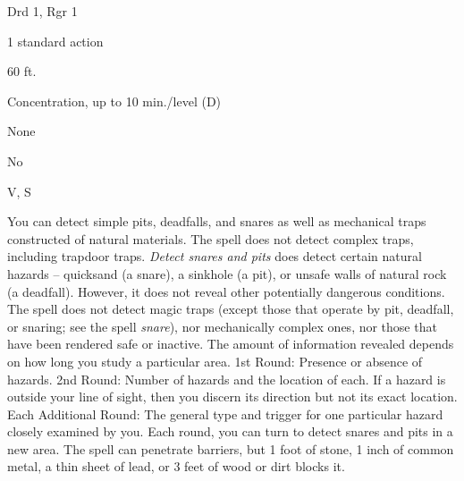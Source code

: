 
\begin{description*}
\item[Level:] Drd 1, Rgr 1
\item[Casting Time:] 1 standard action
\item[Range:] 60 ft.
\item[Duration:] Concentration, up to 10 min./level (D)
\item[Saving Throw:] None
\item[Spell Resistance:] No
\item[Components:] V, S
\end{description*}

You can detect simple pits, deadfalls, and snares as well as mechanical traps constructed
of natural materials. The spell does not detect complex traps, including trapdoor
traps.
\textit{Detect snares and pits} does detect certain natural hazards -- quicksand
(a snare), a sinkhole (a pit), or unsafe walls of natural rock (a deadfall). However,
it does not reveal other potentially dangerous conditions. The spell does not detect
magic traps (except those that operate by pit, deadfall, or snaring; see the spell
\textit{snare}), nor mechanically complex ones, nor those that have been rendered
safe or inactive.
The amount of information revealed depends on how long you study a particular area.
1st Round: Presence or absence of hazards.
2nd Round: Number of hazards and the location of each. If a hazard is
outside your line of sight, then you discern its direction but not its exact location.
Each Additional Round: The general type and trigger for one particular
hazard closely examined by you.
Each round, you can turn to detect snares and pits in a new area. The spell can
penetrate barriers, but 1 foot of stone, 1 inch of common metal, a thin sheet of
lead, or 3 feet of wood or dirt blocks it.